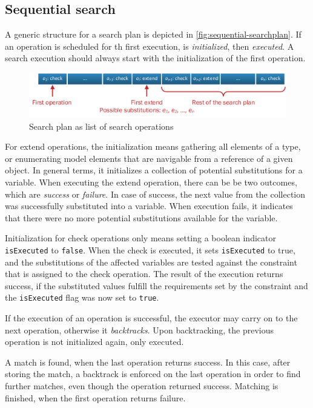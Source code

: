 \subsection{Sequential search}
\label{sec:sequential-search}


A generic structure for a search plan is depicted in \autoref{fig:sequential-searchplan}. If an operation is scheduled for th first execution, is \emph{initialized}, then \emph{executed}. A search execution should always start with the initialization of the first operation.


\begin{figure}[!htp]
	\centering
	\includegraphics[width=\textwidth]{figures/pdfs/sequential.pdf}
	\caption{Search plan as list of search operations}
	\label{fig:sequential-searchplan}
\end{figure}

For extend operations, the initialization means gathering all elements of a type, or enumerating model elements that are navigable from a reference of a given object. In general terms, it initializes a collection of potential substitutions for a variable. When executing the extend operation, there can be be two outcomes, which are \emph{success} or \emph{failure}. In case of success, the next value from the collection was successfully substituted into a variable. When execution fails, it indicates that there were no more potential substitutions available for the variable.

Initialization for check operations only means setting a boolean indicator \texttt{isExecuted} to \texttt{false}. When the check is executed, it sets \texttt{isExecuted} to true, and the substitutions of the affected variables are tested against the constraint that is assigned to the check operation. The result of the execution returns success, if the substituted values fulfill the requirements set by the constraint and the \texttt{isExecuted} flag was now set to \texttt{true}.

If the execution of an operation is successful, the executor may carry on to the next operation, otherwise it \emph{backtracks}. Upon backtracking, the previous operation is not initialized again, only executed. 

A match is found, when the last operation returns success. In this case, after storing the match, a backtrack is enforced on the last operation in order to find further matches, even though the operation returned success. Matching is finished, when the first operation returns failure.




